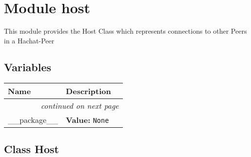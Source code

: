 %
%
%


\section{Module host}

    \label{host}
This module provides the Host Class which represents connections to other 
Peers in a Hachat-Peer



  \subsection{Variables}

    \vspace{-1cm}
\hspace{\varindent}\begin{longtable}{|p{\varnamewidth}|p{\vardescrwidth}|l}
\cline{1-2}
\cline{1-2} \centering \textbf{Name} & \centering \textbf{Description}& \\
\cline{1-2}
\endhead\cline{1-2}\multicolumn{3}{r}{\small\textit{continued on next page}}\\\endfoot\cline{1-2}
\endlastfoot\raggedright \_\-\_\-p\-a\-c\-k\-a\-g\-e\-\_\-\_\- & \raggedright \textbf{Value:} 
{\tt None}&\\
\cline{1-2}
\end{longtable}



\subsection{Class Host}

